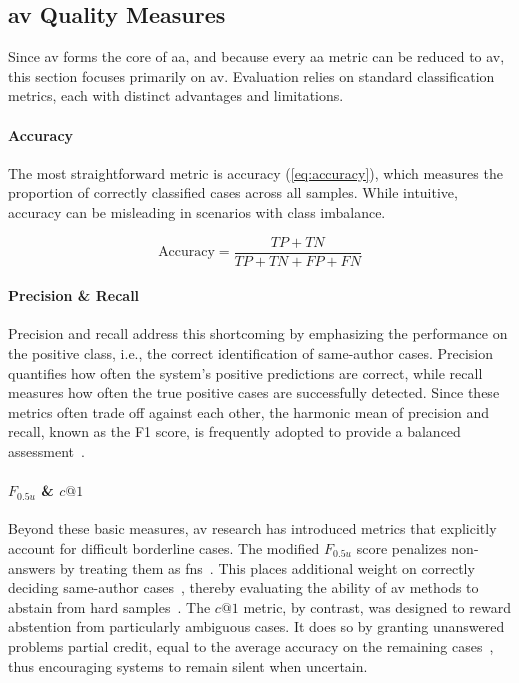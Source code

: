 \subsection{\ac{av} Quality Measures}
\label{subsec:av_quality_measures}

Since \ac{av} forms the core of \ac{aa}, and because every \ac{aa} metric can be reduced to \ac{av}, this section focuses primarily on \ac{av}. 
Evaluation relies on standard classification metrics, each with distinct advantages and limitations.

\paragraph{Accuracy}
The most straightforward metric is accuracy (\autoref{eq:accuracy}), which measures the proportion of correctly classified cases across all samples. 
While intuitive, accuracy can be misleading in scenarios with class imbalance. 

\begin{equation}\label{eq:accuracy}
    \text{Accuracy} = \frac{TP + TN}{TP + TN + FP + FN}
\end{equation}

\paragraph{Precision \& Recall}
Precision and recall address this shortcoming by emphasizing the performance on the positive class, i.e., the correct identification of same-author cases. 
Precision quantifies how often the system’s positive predictions are correct, while recall measures how often the true positive cases are successfully detected. 
Since these metrics often trade off against each other, the harmonic mean of precision and recall, known as the F1 score, is frequently adopted to provide a balanced assessment~\citep{neal_surveying_2018}.

\paragraph{$F_{0.5u}$ \& $c@1$}
Beyond these basic measures, \ac{av} research has introduced metrics that explicitly account for difficult borderline cases. 
The modified $F_{0.5u}$ score penalizes non-answers by treating them as \acp{fn}~\citep{bevendorff_overview_2024}. 
This places additional weight on correctly deciding same-author cases~\citep{weerasinghe_feature_vector_difference_2021}, thereby evaluating the ability of \ac{av} methods to abstain from hard samples~\citep{tyo_state_2022}. 
The $c@1$ metric, by contrast, was designed to reward abstention from particularly ambiguous cases. 
It does so by granting unanswered problems partial credit, equal to the average accuracy on the remaining cases~\citep{bevendorff_overview_2024}, thus encouraging systems to remain silent when uncertain.

